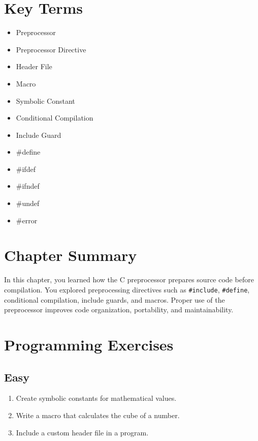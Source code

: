 \documentclass[12pt,openany]{book}
\begin{document}
\section{Key Terms}

\begin{itemize}
    \item Preprocessor
    \item Preprocessor Directive
    \item Header File
    \item Macro
    \item Symbolic Constant
    \item Conditional Compilation
    \item Include Guard
    \item \#define
    \item \#ifdef
    \item \#ifndef
    \item \#undef
    \item \#error
\end{itemize}

\section{Chapter Summary}

In this chapter, you learned how the C preprocessor prepares source code before compilation. You explored preprocessing directives such as \texttt{\#include}, \texttt{\#define}, conditional compilation, include guards, and macros. Proper use of the preprocessor improves code organization, portability, and maintainability.

\section{Programming Exercises}

\subsection*{Easy}

\begin{enumerate}
    \item Create symbolic constants for mathematical values.
    \item Write a macro that calculates the cube of a number.
    \item Include a custom header file in a program.
\end{enumerate}
\end{document}

